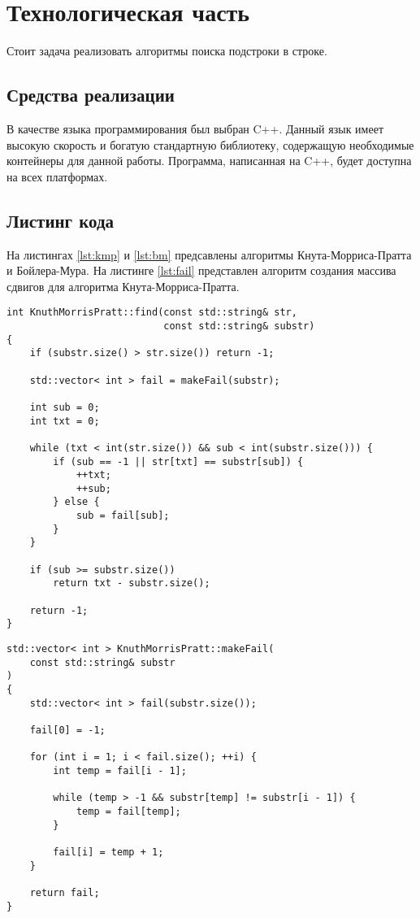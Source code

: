 \newpage
\section{Технологическая часть}

Стоит задача реализовать алгоритмы поиска подстроки в строке.

\subsection{Средства реализации}

В качестве языка программирования был выбран {\ttfamily C++}.
Данный язык имеет высокую скорость и богатую стандартную библиотеку,
содержащую необходимые контейнеры для данной работы. Программа, написанная на
{\ttfamily C++}, будет доступна на всех платформах.

\subsection{Листинг кода}

На листингах \ref{lst:kmp} и \ref{lst:bm} предсавлены алгоритмы
Кнута-Морриса-Пратта и Бойлера-Мура. На листинге \ref{lst:fail} представлен
алгоритм создания массива сдвигов для алгоритма Кнута-Морриса-Пратта.

\begin{lstlisting}[caption=Алгоритм Кнута-Морриса-Пратта,label=lst:kmp]
int KnuthMorrisPratt::find(const std::string& str,
                           const std::string& substr)
{
    if (substr.size() > str.size()) return -1;

    std::vector< int > fail = makeFail(substr);

    int sub = 0;
    int txt = 0;

    while (txt < int(str.size()) && sub < int(substr.size())) {
        if (sub == -1 || str[txt] == substr[sub]) {
            ++txt;
            ++sub;
        } else {
            sub = fail[sub];
        }
    }

    if (sub >= substr.size())
        return txt - substr.size();

    return -1;
}
\end{lstlisting}

\begin{lstlisting}[caption=Алгоритм создания массива сдвигов,label=lst:fail]
std::vector< int > KnuthMorrisPratt::makeFail(
    const std::string& substr
)
{
    std::vector< int > fail(substr.size());

    fail[0] = -1;

    for (int i = 1; i < fail.size(); ++i) {
        int temp = fail[i - 1];

        while (temp > -1 && substr[temp] != substr[i - 1]) {
            temp = fail[temp];
        }

        fail[i] = temp + 1;
    }

    return fail;
}
\end{lstlisting}

